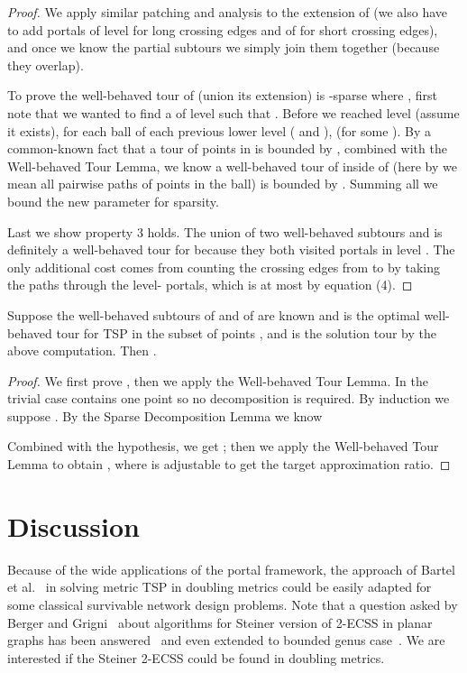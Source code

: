 \documentclass{llncs}
\begin{document}
\begin{proof}
We apply similar patching and analysis to the extension of  (we also have to add portals of level  for long crossing edges and of  for short crossing edges), and once we know the partial subtours we simply join them together (because they overlap).

To prove the well-behaved tour of  (union its extension) is -sparse where , first note that we wanted to find a  of level  such that .
Before we reached level  (assume it exists), for each ball of each previous lower level  ( and ),  (for some ).
By a common-known fact that a tour of points in  is bounded by , combined with the Well-behaved Tour Lemma, we know a well-behaved tour of  inside of  (here by  we mean all pairwise paths of points in the ball) is bounded by .
Summing all  we bound the new parameter for sparsity.

Last we show property 3 holds.
The union of two well-behaved subtours  and  is definitely a well-behaved tour for  because they both visited portals in level .
The only additional cost comes from counting the crossing edges from  to  by taking the paths through the level- portals, which is at most  by equation (4).
\end{proof}

\begin{lemma}
Suppose the well-behaved subtours of  and of  are known and  is the optimal well-behaved tour for TSP in the subset of points , and  is the solution tour by the above computation.
Then .
\end{lemma}
\begin{proof}
We first prove , then we apply the Well-behaved Tour Lemma.
In the trivial case  contains one point so no decomposition is required.
By induction we suppose .
By the Sparse Decomposition Lemma we know 

Combined with the hypothesis, we get ; then we apply the Well-behaved Tour Lemma to obtain , where  is adjustable to get the target approximation ratio.
\end{proof}




\section{Discussion}

Because of the wide applications of the portal framework, the approach of Bartel {et al.}~\cite{Bartal12} in solving metric TSP in doubling metrics could be easily adapted for some classical survivable network design problems.
Note that a question asked by Berger and Grigni~\cite{Grigni07} about algorithms for Steiner version of 2-ECSS in planar graphs has been answered~\cite{Borradaile08} and even extended to bounded genus case~\cite{Borradaile09}.
We are interested if the Steiner 2-ECSS could be found in doubling metrics.
\end{document}
